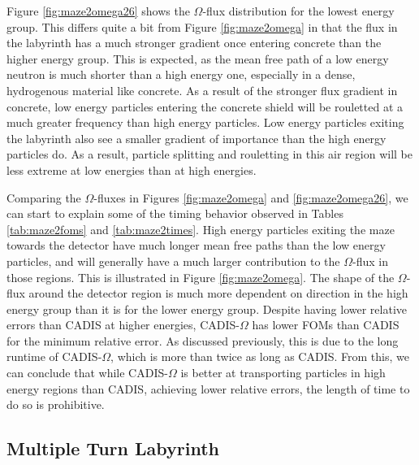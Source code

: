 Figure \ref{fig:maze2omega26} shows the $\Omega$-flux distribution for the
lowest energy group. This differs quite a bit from Figure \ref{fig:maze2omega} in that
the flux in the labyrinth has a much stronger gradient once entering concrete
than the higher energy group. This is expected, as the mean free path of a low
energy neutron is much shorter than a high energy one, especially in a dense,
hydrogenous material like concrete. As a result of the stronger flux gradient in
concrete, low energy particles entering
the concrete shield will be rouletted at a much greater frequency than high
energy particles. Low energy particles exiting the labyrinth also see a smaller gradient of
importance than the high energy particles do. As a result,
particle splitting and rouletting in this air region will be less extreme at low
energies than at high energies.

Comparing the $\Omega$-fluxes in Figures \ref{fig:maze2omega} and
\ref{fig:maze2omega26}, we can start to explain some of the timing behavior
observed in Tables \ref{tab:maze2foms} and \ref{tab:maze2times}.
High energy particles exiting the maze towards the 
detector have much longer mean free paths than the low energy particles, and
will generally have a much larger contribution to the $\Omega$-flux in those
regions. This is illustrated in Figure \ref{fig:maze2omega}.
The shape of the $\Omega$-flux 
around the detector region is much more dependent on direction in
the high energy group than it is for the lower energy group.
Despite having lower relative errors than CADIS at higher energies,
CADIS-$\Omega$ has lower FOMs than CADIS for the
minimum relative error. As discussed previously, this is due to the long runtime
of CADIS-$\Omega$, which is more than twice as long as CADIS. From this, we can
conclude that while CADIS-$\Omega$ is better at transporting particles in high
energy regions than CADIS, achieving lower relative errors, the length of time
to do so is prohibitive.

\subsection{Multiple Turn Labyrinth}
\label{subsec:maze1}


